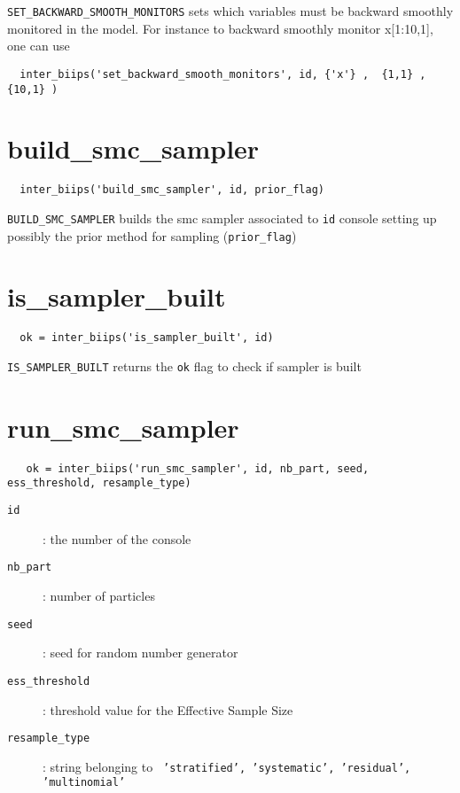 \documentclass[11pt]{article}
\begin{document}
   \texttt{SET\_BACKWARD\_SMOOTH\_MONITORS} sets which variables must be backward smoothly monitored in the model. For instance to backward smoothly monitor x[1:10,1], one can use
 \begin{lstlisting}
  inter_biips('set_backward_smooth_monitors', id, {'x'} ,  {1,1} , {10,1} )
 \end{lstlisting}

\section{build\_smc\_sampler}

 \begin{lstlisting}
  inter_biips('build_smc_sampler', id, prior_flag)
 \end{lstlisting}
  \texttt{BUILD\_SMC\_SAMPLER} builds the smc sampler associated to \texttt{id} console setting up possibly the prior method for sampling (\texttt{prior\_flag})

\section{is\_sampler\_built}

 \begin{lstlisting}
  ok = inter_biips('is_sampler_built', id)
 \end{lstlisting}
  \texttt{IS\_SAMPLER\_BUILT} returns the \texttt{ok} flag to check if sampler is built
\section{run\_smc\_sampler}

 \begin{lstlisting}
   ok = inter_biips('run_smc_sampler', id, nb_part, seed, ess_threshold, resample_type)
 \end{lstlisting}
 
   \begin{description}
     \item[\texttt{id}]: the number of the console
     \item[\texttt{nb\_part}]: number of particles 
     \item[\texttt{seed}]: seed for random number generator
     \item[\texttt{ess\_threshold}]: threshold value for the Effective Sample Size
     \item[\texttt{resample\_type}]: string belonging to \texttt{ 'stratified', 'systematic', 'residual', 'multinomial' } 
   
   \end{description}
\end{document}
